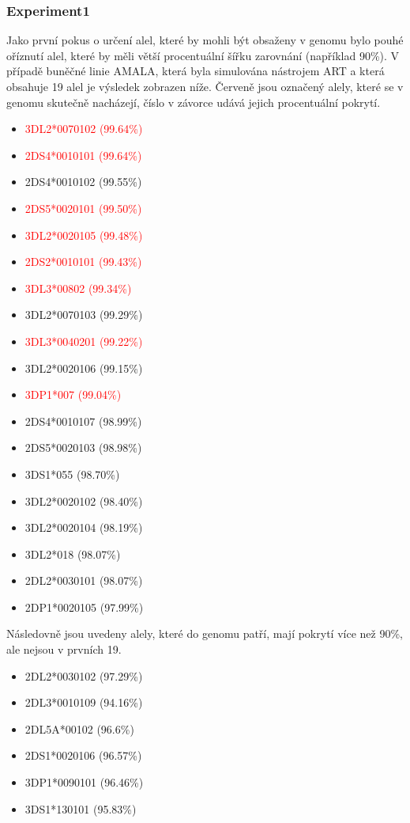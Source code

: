 \documentclass[czech,DP]{thesiskiv}
\numberwithin{equation}{section}
\begin{document}
\subsubsection{Experiment1}
Jako první pokus o určení alel, které by mohli být obsaženy v genomu bylo pouhé oříznutí alel, které by měli větší procentuální šířku zarovnání (například 90\%).  V případě buněčné linie AMALA, která byla simulována nástrojem ART a která obsahuje 19 alel je výsledek zobrazen níže. Červeně jsou označený alely, které se v genomu skutečně nacházejí, číslo v závorce udává jejich procentuální pokrytí.
\begin{multicols}{2}
\begin{itemize}
	\itemsep0em
	\item \textcolor{red}{3DL2*0070102 (99.64\%) }
	\item \textcolor{red}{2DS4*0010101 (99.64\%) }
	\item 2DS4*0010102 (99.55\%)
	\item \textcolor{red}{2DS5*0020101 (99.50\%) }
	\item \textcolor{red}{3DL2*0020105 (99.48\%) }
	\item \textcolor{red}{2DS2*0010101 (99.43\%) }
	\item \textcolor{red}{3DL3*00802 (99.34\%) }
	\item 3DL2*0070103 (99.29\%) 
	\item \textcolor{red}{3DL3*0040201 (99.22\%) }
	\item 3DL2*0020106 (99.15\%)
	\item \textcolor{red}{3DP1*007 (99.04\%) }
	\item 2DS4*0010107 (98.99\%)
	\item 2DS5*0020103 (98.98\%)
	\item 3DS1*055 (98.70\%)
	\item 3DL2*0020102 (98.40\%)
	\item 3DL2*0020104 (98.19\%)
	\item 3DL2*018 (98.07\%)
	\item 2DL2*0030101 (98.07\%)
	\item 2DP1*0020105 (97.99\%)
\end{itemize}
\end{multicols}

\noindent
Následovně jsou uvedeny alely, které do genomu patří, mají pokrytí více než 90\%, ale nejsou v prvních 19.
\begin{multicols}{2}
\begin{itemize}
	\itemsep0em
	\item 2DL2*0030102 (97.29\%)
	\item 2DL3*0010109 (94.16\%)
	\item 2DL5A*00102 (96.6\%)
	\item 2DS1*0020106 (96.57\%)
	\item 3DP1*0090101 (96.46\%)
	\item 3DS1*130101 (95.83\%)
\end{itemize}
\end{multicols}
\end{document}
